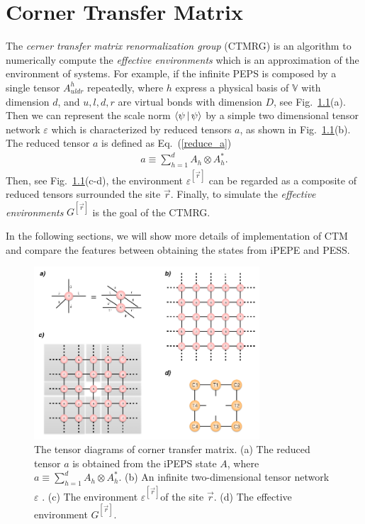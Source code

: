\chapter{Corner Transfer Matrix}
\label{chapter:ctm}
The \textit{cerner transfer matrix renormalization group} (CTMRG) \cite{doi:10.1143/JPSJ.65.891,PhysRevB.80.094403,PhysRevB.84.041108} is an algorithm to numerically compute the \textit{effective environments} which is an approximation of the environment of systems. For example, if the infinite PEPS is composed by a single tensor $A^{h}_{uldr}$ repeatedly, where $h$ express a physical basis of  $\mathbb{V}$ with dimension $d$, and $u,l,d,r$ are virtual bonds with dimension $D$, see Fig.~\ref{fig501}(a). Then we can represent the scale norm $\Braket{\psi|\psi}$ by a simple two dimensional tensor network $\varepsilon$ which is characterized by reduced tensors $a$, as shown in Fig.~\ref{fig501}(b). The reduced tensor $a$ is defined as Eq.~(\ref{reduce_a})
\begin{align}
	\label{reduce_a}
	a \equiv \sum_{h=1}^{d} A_{h} \otimes A^{*}_{h}.
\end{align}
Then, see Fig.~\ref{fig501}(c-d), the environment $\varepsilon^{[\vec{r}]}$ can be regarded as a composite of reduced tensors surrounded the site $\vec{r}$. Finally, to simulate the \textit{effective environments} $G^{[\vec{r}]}$ is the goal of the CTMRG.

In the following sections, we will show more details of implementation of CTM and compare the features between obtaining the states from iPEPE and PESS.

\begin{figure}[ht]
	\centering
	\includegraphics[width=0.75\textwidth]{figures/fig501.png}
	\caption[The tensor diagrams of the corner transfer matrix with the one-site unit cell.]{The tensor diagrams of corner transfer matrix. (a) The reduced tensor $a$ is obtained from the iPEPS state $A$, where $a \equiv \sum_{h=1}^{d} A_{h} \otimes A^{*}_{h}$. (b) An infinite two-dimensional tensor network $\varepsilon$ . (c) The environment $\varepsilon^{[\vec{r}]}$of the site $\vec{r}$. (d) The effective environment $G^{[\vec{r}]}$.}
	\label{fig501}
\end{figure}

